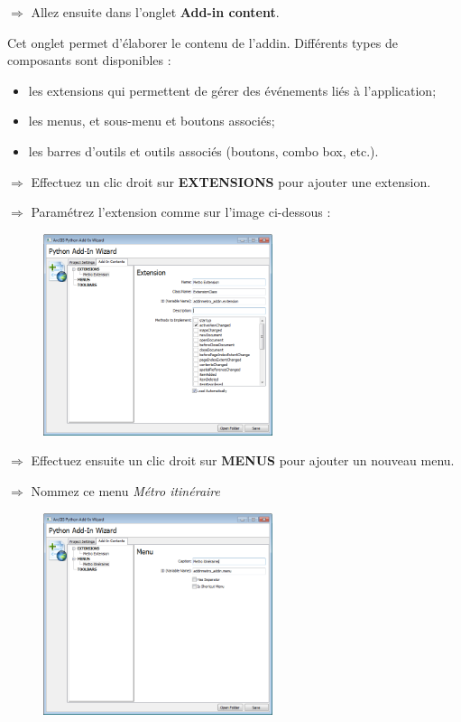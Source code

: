 \documentclass[11pt]{article}
\newcommand{\action}{$\Rightarrow$ }
\begin{document}
\action Allez ensuite dans l'onglet \textbf{Add-in content}.

Cet onglet permet d'élaborer le contenu de l'addin. Différents types de composants sont disponibles :
\begin{itemize}
	\item les extensions qui permettent de gérer des événements liés à l'application;
	\item les menus, et sous-menu et boutons associés;
	\item les barres d'outils et outils associés (boutons, combo box, etc.).
\end{itemize}

\action Effectuez un clic droit sur \textbf{EXTENSIONS} pour ajouter une extension.

\action Paramétrez l'extension comme sur l'image ci-dessous :
\begin{figure}[H]
	\center \includegraphics[width=0.6\textwidth]{img/td3/addin_assistant-2.png} \\
\end{figure}

\action Effectuez ensuite un clic droit sur \textbf{MENUS} pour ajouter un nouveau menu.

\action Nommez ce menu \textit{Métro itinéraire}
\begin{figure}[H]
	\center \includegraphics[width=0.6\textwidth]{img/td3/addin_assistant-3.png} \\
\end{figure}
\end{document}
